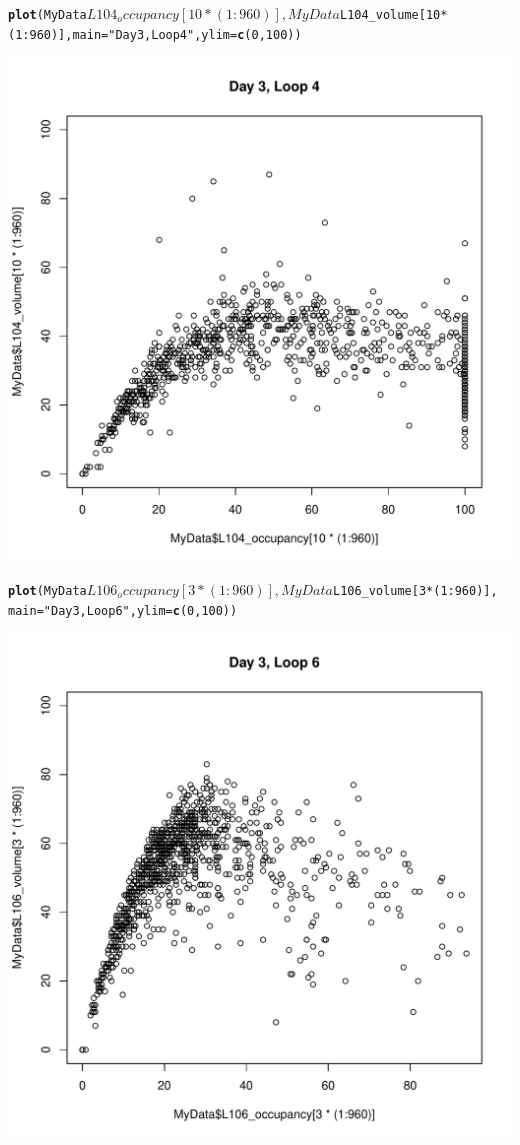 \documentclass[review, authoryear]{elsarticle}\usepackage{graphicx, color}
\makeatletter
\def\maxwidth{ %
  \ifdim\Gin@nat@width>\linewidth
    \linewidth
  \else
    \Gin@nat@width
  \fi
}
\newcommand{\hlfunctioncall}[1]{\textcolor[rgb]{0.501960784313725,0,0.329411764705882}{\textbf{#1}}}%
\newcommand{\hlstring}[1]{\textcolor[rgb]{0.6,0.6,1}{#1}}%
\newenvironment{kframe}{%
 \def\at@end@of@kframe{}%
 \ifinner\ifhmode%
  \def\at@end@of@kframe{\end{minipage}}%
  \begin{minipage}{\columnwidth}%
 \fi\fi%
 \def\FrameCommand##1{\hskip\@totalleftmargin \hskip-\fboxsep
 \colorbox{shadecolor}{##1}\hskip-\fboxsep
     \hskip-\linewidth \hskip-\@totalleftmargin \hskip\columnwidth}%
 \MakeFramed {\advance\hsize-\width
   \@totalleftmargin\z@ \linewidth\hsize
   \@setminipage}}%
 {\par\unskip\endMakeFramed%
 \at@end@of@kframe}
\newenvironment{knitrout}{}{} %
\makeatother
\begin{document}
\begin{knitrout}
\begin{kframe}
\begin{alltt}
\hlfunctioncall{plot}(MyData$L104_occupancy[10 * (1:960)], MyData$L104_volume[10 * 
    (1:960)], main = \hlstring{"Day 3, Loop 4"}, ylim = \hlfunctioncall{c}(0, 100))
\end{alltt}
\end{kframe}\includegraphics[width=\maxwidth]{figure/unnamed-chunk-14} \begin{kframe}\begin{alltt}
\hlfunctioncall{plot}(MyData$L106_occupancy[3 * (1:960)], MyData$L106_volume[3 * (1:960)], 
    main = \hlstring{"Day 3, Loop 6"}, ylim = \hlfunctioncall{c}(0, 100))
\end{alltt}
\end{kframe}\includegraphics[width=\maxwidth]{figure/unnamed-chunk-15} \begin{kframe}\begin{alltt}

\end{alltt}
\end{kframe}
\end{knitrout}
\end{document}
